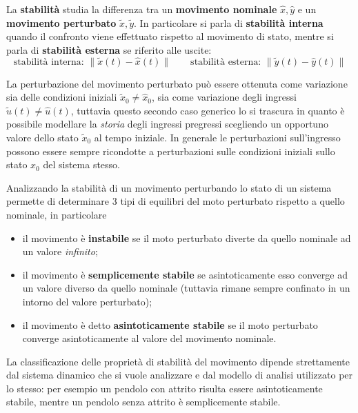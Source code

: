 	\begin{concetto}
		La \textbf{stabilità} studia la differenza tra un \textbf{movimento nominale} $\hat x, \hat y$ e un \textbf{movimento perturbato} $\tilde x, \tilde y$. In particolare si parla di \textbf{stabilità interna} quando il confronto viene effettuato rispetto al movimento di stato, mentre si parla di \textbf{stabilità esterna} se riferito alle uscite:
		\[ \textrm{stabilità interna: } \|\tilde x(t) - \hat x(t) \| \qquad \textrm{stabilità esterna: } \|\tilde y(t) - \hat y(t) \| \]
	\end{concetto}
	
	La perturbazione del movimento perturbato può essere ottenuta come variazione sia delle condizioni iniziali $\tilde x_0\neq \hat x_0$, sia come variazione degli ingressi $\tilde u(t) \neq \hat u(t)$, tuttavia questo secondo caso generico lo si trascura in quanto è possibile modellare la \textit{storia} degli ingressi pregressi scegliendo un opportuno valore dello stato $\tilde x_0$ al tempo iniziale. In generale le perturbazioni sull'ingresso possono essere sempre ricondotte a perturbazioni sulle condizioni iniziali sullo stato $x_0$ del sistema stesso.
	
	\begin{concetto}
		Analizzando la stabilità di un movimento perturbando lo stato di un sistema permette di determinare 3 tipi di equilibri del moto perturbato rispetto a quello nominale, in particolare
		\begin{itemize}
			\item il movimento è \textbf{instabile} se il moto perturbato diverte da quello nominale ad un valore \textit{infinito};
			\item il movimento è \textbf{semplicemente stabile} se asintoticamente esso converge ad un valore diverso da quello nominale (tuttavia rimane sempre confinato in un intorno del valore perturbato);
			\item il movimento è detto \textbf{asintoticamente stabile} se il moto perturbato converge asintoticamente al valore del movimento nominale.
		\end{itemize}
	\end{concetto}
	
	La classificazione delle proprietà di stabilità del movimento dipende strettamente dal sistema dinamico che si vuole analizzare e dal modello di analisi utilizzato per lo stesso: per esempio un pendolo con attrito risulta essere asintoticamente stabile, mentre un pendolo senza attrito è semplicemente stabile.
	
